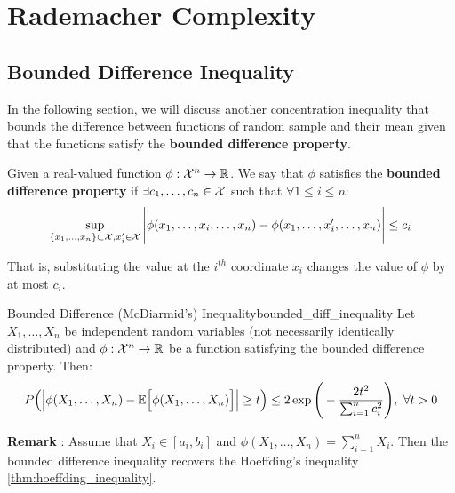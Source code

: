 \newpage\section{Rademacher Complexity}
\subsection{Bounded Difference Inequality}
In the following section, we will discuss another concentration inequality that bounds the difference between functions of random sample and their mean given that the functions satisfy the \textbf{bounded difference property}.

\begin{definition}
    Given a real-valued function $\phi:\mathcal{X}^n\to\mathbb{R}$. We say that $\phi$ satisfies the \textbf{bounded difference property} if $\exists c_1, \dots, c_n\in\mathcal{X}$ such that $\forall 1 \le i \le n$:
    \begin{align*}
        \sup_{\{x_1, \dots, x_n\}\subset\mathcal{X}, x_i' \in \mathcal{X}}
        \Bigg| 
            \phi(x_1, \dots, x_i, \dots, x_n) - \phi(x_1, \dots, x_i', \dots, x_n)
         \Bigg| \le c_i
    \end{align*}

    \noindent That is, substituting the value at the $i^{th}$ coordinate $x_i$ changes the value of $\phi$ by at most $c_i$.
\end{definition}

\begin{theorem}{Bounded Difference (McDiarmid's) Inequality}{bounded_diff_inequality}
    Let $X_1, \dots, X_n$ be independent random variables (not necessarily identically distributed) and $\phi:\mathcal{X}^n \to \mathbb{R}$ be a function satisfying the bounded difference property. Then:
    \begin{align*}
        P\Big( 
            \Big| 
                \phi(X_1, \dots, X_n) - \mathbb{E}\Big[  \phi(X_1, \dots, X_n)  \Big]
             \Big| \ge t
         \Big) \le 2\exp\Bigg( 
            -\frac{2t^2}{\sum_{i=1}^n c_i^2}
         \Bigg), \ \forall t > 0
    \end{align*}
\end{theorem}

\noindent\textbf{Remark} : Assume that $X_i\in[a_i, b_i]$ and $\phi(X_1, \dots, X_n)=\sum_{i=1}^n X_i$. Then the bounded difference inequality recovers the Hoeffding's inequality \ref{thm:hoeffding_inequality}.

